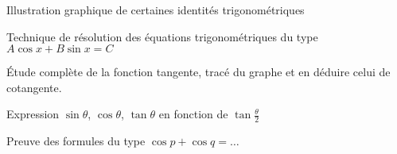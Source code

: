 \documentclass{article}
\begin{document}
\begin{question_kholle}{Illustration graphique de certaines identités trigonométriques}
    
\end{question_kholle}
\begin{question_kholle}{Technique de résolution des équations trigonométriques du type $A \cos x + B \sin x = C$}
    
\end{question_kholle}
\begin{question_kholle}{Étude complète de la fonction tangente, tracé du graphe et en déduire celui de cotangente.}
    
\end{question_kholle}
\begin{question_kholle}{Expression $\sin \theta$, $\cos \theta$, $\tan \theta$ en fonction de $\tan \frac \theta 2$}

\end{question_kholle}
\begin{question_kholle}{Preuve des formules du type $\cos p + \cos q = \dots$}
    
\end{question_kholle}
\end{document}
